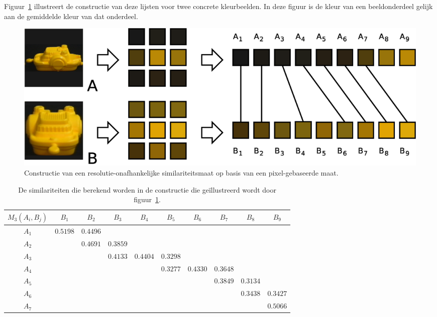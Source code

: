 Figuur~\ref{fig:multires} illustreert de constructie van deze lijsten voor twee concrete
kleurbeelden. In deze figuur is de kleur van een beeldonderdeel gelijk aan de gemiddelde 
kleur van dat onderdeel.
\begin{figure}[tbp]
\begin{center}
\includegraphics[width=\textwidth]{images/multires.eps}
\caption{\label{fig:multires}Constructie van een resolutie-onafhankelijke similariteitsmaat op basis van een pixel-gebaseerde maat.}
\end{center}
\end{figure}
\begin{table}
\begin{center}
\begin{tabular}{|c|ccccccccc|}
\hline
$\scriptstyle M_3(A_i,B_j)$	& $B_1$ & $B_2$ & $B_3$ & $B_4$ & $B_5$ & $B_6$ & $B_7$ & $B_8$ & $B_9$  \\
\hline
$A_1$ 	& $\mathbf{\scriptstyle 0.5198}$ & $\scriptstyle 0.4496$ & & & & & & & \\
$A_2$ 	& & $\mathbf{\scriptstyle 0.4691}$ & $\scriptstyle 0.3859$ & & & & & & \\
$A_3$ 	& & & $\scriptstyle 0.4133$ & $\mathbf{\scriptstyle 0.4404}$ & $\scriptstyle 0.3298$ & & & & \\
$A_4$ 	& & & & & $\scriptstyle 0.3277$ & $\mathbf{\scriptstyle 0.4330}$ & $\scriptstyle 0.3648$ & & \\
$A_5$ 	& & & & & & & $\mathbf{\scriptstyle 0.3849}$ & $\scriptstyle 0.3134$ & \\
$A_6$ 	& & & & & & & & $\mathbf{\scriptstyle 0.3438}$ & $\scriptstyle 0.3427$ \\
$A_7$ 	& & & & & & & & & $\mathbf{\scriptstyle 0.5066}$ \\
\hline
\end{tabular}
\caption{\label{tab:multires}De similariteiten die berekend worden in de constructie die ge\"illustreerd wordt door figuur~\ref{fig:multires}.}
\end{center}
\end{table}

